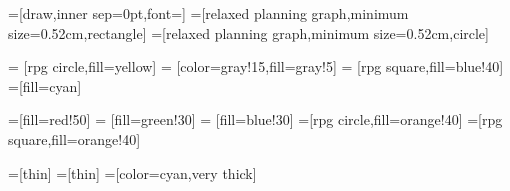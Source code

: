 

\date{April 29, 2020}


\usetikzlibrary{shapes}

=[draw,inner sep=0pt,font=\small]
=[relaxed planning graph,minimum size=0.52cm,rectangle]
=[relaxed planning graph,minimum size=0.52cm,circle]

=        [rpg circle,fill=yellow]
=    [color=gray!15,fill=gray!5]
=    [rpg square,fill=blue!40]
=[fill=cyan]

=[fill=red!50]
 = [fill=green!30]
 = [fill=blue!30]
=[rpg circle,fill=orange!40]
=[rpg square,fill=orange!40]

=[thin]
=[thin]
=[color=cyan,very thick]

\newcommand{\markplusone}[1]{\path (#1) +(-0.04cm,0.28cm) node {\tiny $+1$};}
\newcommand{\markopnode}[3][0.35cm]{\path (#2) +(0cm,#1) node {\tiny
    \ensuremath{#3}};}
\newcommand{\markopnodeff}[3][0.30cm]{\path (#2) +(0cm,#1) node {\tiny
    \ensuremath{#3}};}
\newcommand{\markopcost}[2]{\path (#1) +(0.45cm,0.15cm) node {\tiny $+#2$};}

\newcommand{\pre}{\ensuremath{\textit{pre}}}
\newcommand{\add}{\ensuremath{\textit{add}}}
\newcommand{\del}{\ensuremath{\textit{del}}}
\newcommand{\relaxation}[1]{\ensuremath{#1^+}}
\newcommand{\hplus}{\ensuremath{h^+}}
\newcommand{\hmax}{\ensuremath{h^{\textup{max}}}}
\newcommand{\hadd}{\ensuremath{h^{\textup{add}}}}
\newcommand{\hff}{\ensuremath{h^{\textup{FF}}}}



